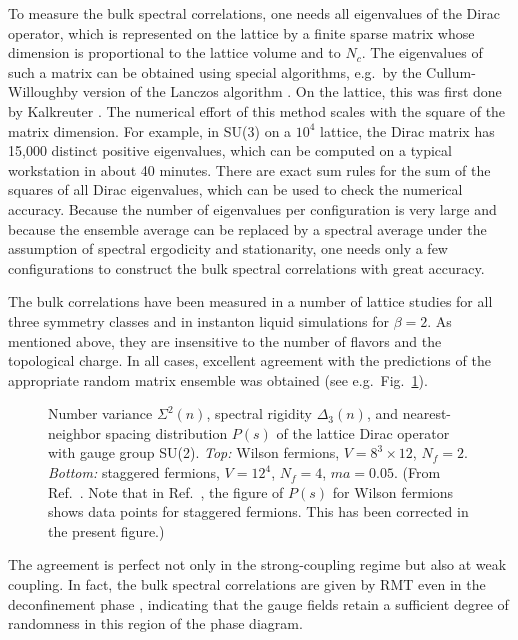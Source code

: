To measure the bulk spectral correlations, one needs all eigenvalues
of the Dirac operator, which is represented on the lattice by a finite
sparse matrix whose dimension is proportional to the lattice volume
and to $N_c$.  The eigenvalues of such a matrix can be obtained using
special algorithms, e.g.\ by the Cullum-Willoughby version of the
Lanczos algorithm \cite{Cull81}.  On the lattice, this was first done
by Kalkreuter \cite{Kalk95}.  The numerical effort of this method
scales with the square of the matrix dimension.  For example, in SU(3)
on a $10^4$ lattice, the Dirac matrix has 15,000 distinct positive
eigenvalues, which can be computed on a typical workstation in about
40 minutes.  There are exact sum rules for the sum of the squares of
all Dirac eigenvalues, which can be used to check the numerical
accuracy.  Because the number of eigenvalues per configuration is very
large and because the ensemble average can be replaced by a spectral
average under the assumption of spectral ergodicity and stationarity,
one needs only a few configurations to construct the bulk spectral
correlations with great accuracy.

The bulk correlations have been measured in a number of lattice
studies for all three symmetry classes
\cite{Hala95a,Verb97a,Pull98,Guhr99,Berg99,Edwa99b} and in instanton
liquid simulations \cite{Osbo98a} for $\beta =2$.  As mentioned
above, they are insensitive to the number of flavors and the
topological charge.  In all cases, excellent agreement with the
predictions of the appropriate random matrix ensemble was obtained
(see e.g.\ Fig.~\ref{bulk}).  
\begin{figure}
  \begin{center}
    \caption{Number variance $\Sigma^2(n)$, spectral rigidity
      $\Delta_3(n)$, and nearest-neighbor spacing distribution $P(s)$
      of the lattice Dirac operator with gauge group SU(2).  {\it Top:}
      Wilson fermions, $V=8^3\times12$, $N_f=2$.  {\it Bottom:}
      staggered fermions, $V=12^4$, $N_f=4$, $ma=0.05$.  (From
      Ref.~\protect\cite{Verb97a}. Note that in
      Ref.~\protect\cite{Verb97a}, the figure of $P(s)$ for Wilson
      fermions shows data points for staggered fermions. This has been
      corrected in the present figure.)}
    \label{bulk}
  \end{center}
\end{figure}
The agreement is perfect not only in
the strong-coupling regime but also at weak coupling.  In fact, the
bulk spectral correlations are given by RMT even in the deconfinement
phase \cite{Pull98,Berg99}, indicating that the gauge fields retain a
sufficient degree of randomness in this region of the phase diagram.

